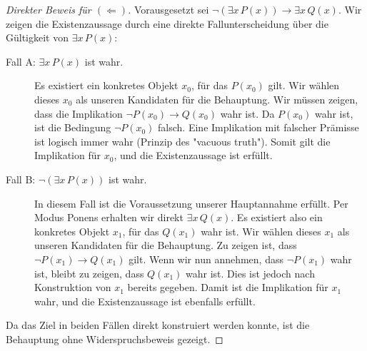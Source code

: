 \documentclass{article}
\begin{document}
\begin{proof}[Direkter Beweis für $(\Leftarrow)$]
Vorausgesetzt sei $\neg(\exists x \, P(x)) \rightarrow \exists x \, Q(x)$. Wir zeigen die Existenzaussage durch eine direkte Fallunterscheidung über die Gültigkeit von $\exists x \, P(x)$:

\begin{description}
    \item[Fall A: $\exists x \, P(x)$ ist wahr.]
    Es existiert ein konkretes Objekt $x_0$, für das $P(x_0)$ gilt. Wir wählen dieses $x_0$ als unseren Kandidaten für die Behauptung. Wir müssen zeigen, dass die Implikation $\neg P(x_0) \rightarrow Q(x_0)$ wahr ist. Da $P(x_0)$ wahr ist, ist die Bedingung $\neg P(x_0)$ falsch. Eine Implikation mit falscher Prämisse ist logisch immer wahr (Prinzip des "vacuous truth"). Somit gilt die Implikation für $x_0$, und die Existenzaussage ist erfüllt.

    \item[Fall B: $\neg(\exists x \, P(x))$ ist wahr.]
    In diesem Fall ist die Voraussetzung unserer Hauptannahme erfüllt. Per Modus Ponens erhalten wir direkt $\exists x \, Q(x)$. Es existiert also ein konkretes Objekt $x_1$, für das $Q(x_1)$ wahr ist. Wir wählen dieses $x_1$ als unseren Kandidaten für die Behauptung. Zu zeigen ist, dass $\neg P(x_1) \rightarrow Q(x_1)$ gilt. Wenn wir nun annehmen, dass $\neg P(x_1)$ wahr ist, bleibt zu zeigen, dass $Q(x_1)$ wahr ist. Dies ist jedoch nach Konstruktion von $x_1$ bereits gegeben. Damit ist die Implikation für $x_1$ wahr, und die Existenzaussage ist ebenfalls erfüllt.
\end{description}
Da das Ziel in beiden Fällen direkt konstruiert werden konnte, ist die Behauptung ohne Widerspruchsbeweis gezeigt.
\end{proof}
\end{document}
